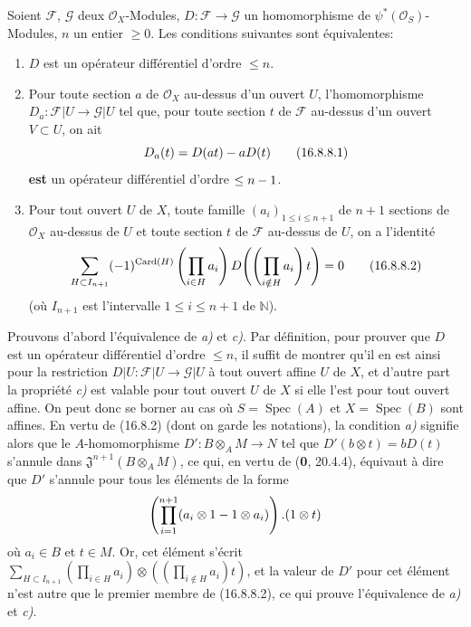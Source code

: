 \begin{proposition}[16.8.8]
\label{IV.16.8.8}
Soient $\mathscr{F}$, $\mathscr{G}$ deux $\mathcal{O}_X$-Modules,
$D:\mathscr{F}\to\mathscr{G}$ un homomorphisme de
$\psi^*(\mathcal{O}_S)$-Modules, $n$ un entier $\geq0$. Les conditions
suivantes sont équivalentes:
\begin{enumerate}
  \item[\textup{a)}] $D$ est un opérateur différentiel d'ordre $\leq n$.
  \item[\textup{b)}] Pour toute section $a$ de $\mathcal{O}_X$ au-dessus d'un ouvert
  $U$, l'homomorphisme $D_a:\mathscr{F}|U\to\mathscr{G}|U$ tel que, pour
  toute section $t$ de $\mathscr{F}$ au-dessus d'un ouvert $V\subset U$, on
  ait
  \[
    D_a(t)=D(at)- aD(t)
    \tag{16.8.8.1}
    \label{IV.16.8.8.1}
  \]
  \textbf{est} un opérateur différentiel d'ordre $\leq n- 1$.
  \item[\textup{c)}] Pour tout ouvert $U$ de $X$, toute famille
  $(a_i)_{1\leq i\leq n+1}$ de $n+1$ sections de $\mathcal{O}_X$ au-dessus
  de $U$ et toute section $t$ de $\mathscr{F}$ au-dessus de $U$, on a
  l'identité
  \[
    \sum_{H\subset I_{n+1}}(- 1)^{\operatorname{Card}(H)}
    \left(\prod_{i\in H}a_i\right)
    D\!\left(\left(\prod_{i\notin H}a_i\right)t\right)=0
    \tag{16.8.8.2}
    \label{IV.16.8.8.2}
  \]
  (où $I_{n+1}$ est l'intervalle $1\leq i\leq n+1$ de $\mathbb{N}$).
\end{enumerate}
\end{proposition}

Prouvons d'abord l'équivalence de \emph{a)} et \emph{c)}. Par définition, pour prouver que
$D$ est un opérateur différentiel d'ordre $\leq n$, il suffit de montrer qu'il
en est ainsi pour la restriction
$D|U:\mathscr{F}|U\to\mathscr{G}|U$ à tout ouvert affine $U$ de $X$, et
d'autre part la propriété \emph{c)} est valable pour tout ouvert $U$ de $X$ si elle
l'est pour tout ouvert affine. On peut donc se borner au cas où
$S=\operatorname{Spec}(A)$ et $X=\operatorname{Spec}(B)$ sont affines. En
vertu de (16.8.2) (dont on garde les notations), la condition \emph{a)} signifie
alors que le $A$-homomorphisme $D':B\otimes_A M\to N$ tel que
$D'(b\otimes t)=bD(t)$ s'annule dans
$\mathfrak{J}^{n+1}(B\otimes_A M)$, ce qui, en vertu de (\textbf{0}, 20.4.4), équivaut
à dire que $D'$ s'annule pour tous les éléments de la forme
\[
  \left(\prod_{i=1}^{n+1}(a_i\otimes1- 1\otimes a_i)\right).(1\otimes t)
\]
où $a_i\in B$ et $t\in M$. Or, cet élément s'écrit
$\sum_{H\subset I_{n+1}}(\prod_{i\in H}a_i)\otimes((\prod_{i\notin H}a_i)t)$,
et la valeur de $D'$ pour cet élément n'est autre que le premier membre de
(16.8.8.2), ce qui prouve l'équivalence de \emph{a)} et \emph{c)}.

